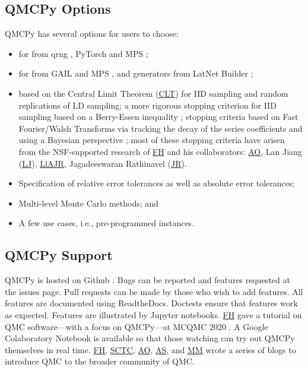 \documentclass[11pt]{NSFamsart}
\newcommand{\FH}{\hyperlink{FHlink}{FH}\xspace}
\newcommand{\SCTC}{\hyperlink{SCTClink}{SCTC}\xspace}
\newcommand{\AO}{\hyperlink{AOlink}{AO}\xspace}
\newcommand{\MM}{\hyperlink{MMlink}{MM}\xspace}
\newcommand{\JR}{\hyperlink{JRlink}{JR}\xspace}
\newcommand{\LlAJR}{\hyperlink{LlAJRlink}{LlAJR}\xspace}
\newcommand{\LJ}{\hyperlink{LJlink}{LJ}\xspace}
\newcommand{\AS}{\hyperlink{ASlink}{AS}\xspace}
\newcommand{\CLT}{\hyperlink{CLTlink}{CLT}\xspace}
\begin{document}
 \subsection{QMCPy Options}
 QMCPy has several options for users to choose:
 \begin{itemize}
 	\item {} for  from  qrng \cite{QRNG2020},  PyTorch \cite{PyTorch} and MPS \cite{Nuy17a};

 	\item {} for  from GAIL \cite{ChoEtal20a} and MPS \cite{Nuy17a}, and generators  from LatNet Builder \cite{LatNet};

 	\item {} based on the \hypertarget{CLTlink}{Central Limit Theorem} (\CLT) for IID sampling and random replications of LD sampling;  a more rigorous stopping criterion for IID sampling based on a Berry-Essen inequality \cite{HicEtal14a};  stopping criteria based on Fast Fourier/Walsh Transforms via tracking the decay of the series coefficients \cite{HicJim16a, JimHic16a} and using a Bayesian perspective \cite{RatHic19a}; most of these stopping criteria have arisen from the NSF-supported research of \FH and his collaborators: \AO, \hypertarget{LJlink}{Lan Jiang} (\LJ),
 	\LlAJR, \hypertarget{JRlink}{Jagadeeswaran Rathinavel} (\JR).

 	\item Specification of relative error tolerances as well as absolute error tolerances;

 	\item Multi-level Monte Carlo methods; and

 	\item A few use cases, i.e., pre-programmed  instances.
 \end{itemize}

\subsection{QMCPy Support}
QMCPy is hosted on Github \cite{QMCPy2020a}. Bugs can be reported and features requested at the issues page.  Pull requests can be made by those who wish to add features.  All features are documented \cite{QMCPyDocs} using ReadtheDocs.  Doctests ensure that features work as expected. Features are illustrated by Jupyter notebooks.  \FH gave a tutorial on QMC software---with a focus on QMCPy---at MCQMC 2020 \cite{MCQMC2020QMCPyTut}.  A Google Colaboratory Notebook \cite{QMCPyTutColab2020} is available so that those watching  can try out QMCPy themselves in real time.  \FH, \SCTC, \AO, \AS, and \MM wrote a series of blogs \cite{QMCBlog} to introduce QMC to the broader community of QMC.
\end{document}

